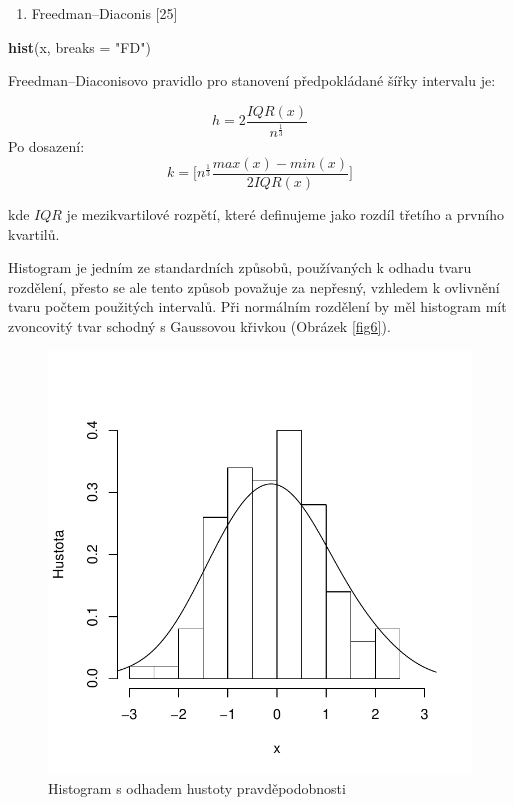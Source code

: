 \documentclass[12pt,]{article}
\newenvironment{Shaded}{\begin{snugshade}}{\end{snugshade}}
\newcommand{\KeywordTok}[1]{\textcolor[rgb]{0.13,0.29,0.53}{\textbf{#1}}}
\newcommand{\DataTypeTok}[1]{\textcolor[rgb]{0.13,0.29,0.53}{#1}}
\newcommand{\StringTok}[1]{\textcolor[rgb]{0.31,0.60,0.02}{#1}}
\newcommand{\NormalTok}[1]{#1}
\providecommand{\tightlist}{%
  \setlength{\itemsep}{0pt}\setlength{\parskip}{0pt}}
\begin{document}
\begin{enumerate}
\def\labelenumi{\arabic{enumi}.}
\setcounter{enumi}{2}
\tightlist
\item
  Freedman--Diaconis {[}25{]}
\end{enumerate}

\begin{Shaded}
\begin{Highlighting}[]
\KeywordTok{hist}\NormalTok{(x, }\DataTypeTok{breaks =} \StringTok{"FD"}\NormalTok{)}
\end{Highlighting}
\end{Shaded}

Freedman--Diaconisovo pravidlo pro stanovení předpokládané šířky
intervalu je:

\[h=2\frac{IQR(x)}{n^{\frac{1}{3}}}\] Po dosazení:
\[k = \Big[n^{\frac{1}{3}}{\frac{max(x)-min(x)}{2IQR(x)}}\Big]\]

kde \(IQR\) je mezikvartilové rozpětí, které definujeme jako rozdíl
třetího a prvního kvartilů.

Histogram je jedním ze standardních způsobů, používaných k odhadu tvaru
rozdělení, přesto se ale tento způsob považuje za nepřesný, vzhledem k
ovlivnění tvaru počtem použitých intervalů. Při normálním rozdělení by
měl histogram mít zvoncovitý tvar schodný s Gaussovou křivkou (Obrázek
\ref{fig6}).

\begin{figure}[H]

{\centering \includegraphics[width=0.6\linewidth]{BP_files/figure-latex/hist_example-1} 

}

\caption{\label{fig6} Histogram s odhadem hustoty pravděpodobnosti}\label{fig:hist_example}
\end{figure}
\end{document}
